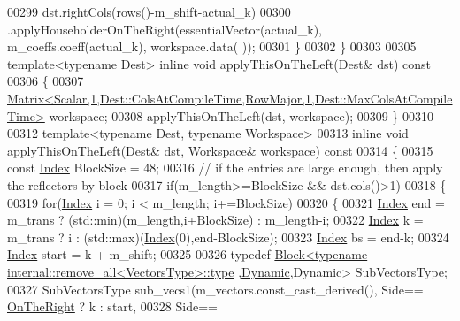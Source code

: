 \begin{DoxyCode}
00299         dst.rightCols(rows()-m\_shift-actual\_k)
00300            .applyHouseholderOnTheRight(essentialVector(actual\_k), m\_coeffs.coeff(actual\_k), workspace.data(
      ));
00301       \}
00302     \}
00303 
00305     \textcolor{keyword}{template}<\textcolor{keyword}{typename} Dest> \textcolor{keyword}{inline} \textcolor{keywordtype}{void} applyThisOnTheLeft(Dest& dst)\textcolor{keyword}{ const}
00306 \textcolor{keyword}{    }\{
00307       
      \hyperlink{group___core___module_class_eigen_1_1_matrix}{Matrix<Scalar,1,Dest::ColsAtCompileTime,RowMajor,1,Dest::MaxColsAtCompileTime>}
       workspace;
00308       applyThisOnTheLeft(dst, workspace);
00309     \}
00310 
00312     \textcolor{keyword}{template}<\textcolor{keyword}{typename} Dest, \textcolor{keyword}{typename} Workspace>
00313     \textcolor{keyword}{inline} \textcolor{keywordtype}{void} applyThisOnTheLeft(Dest& dst, Workspace& workspace)\textcolor{keyword}{ const}
00314 \textcolor{keyword}{    }\{
00315       \textcolor{keyword}{const} \hyperlink{group___core___module_a554f30542cc2316add4b1ea0a492ff02}{Index} BlockSize = 48;
00316       \textcolor{comment}{// if the entries are large enough, then apply the reflectors by block}
00317       \textcolor{keywordflow}{if}(m\_length>=BlockSize && dst.cols()>1)
00318       \{
00319         \textcolor{keywordflow}{for}(\hyperlink{group___core___module_a554f30542cc2316add4b1ea0a492ff02}{Index} i = 0; i < m\_length; i+=BlockSize)
00320         \{
00321           \hyperlink{group___core___module_a554f30542cc2316add4b1ea0a492ff02}{Index} end = m\_trans ? (std::min)(m\_length,i+BlockSize) : m\_length-i;
00322           \hyperlink{group___core___module_a554f30542cc2316add4b1ea0a492ff02}{Index} k = m\_trans ? i : (std::max)(\hyperlink{namespace_eigen_a62e77e0933482dafde8fe197d9a2cfde}{Index}(0),end-BlockSize);
00323           \hyperlink{group___core___module_a554f30542cc2316add4b1ea0a492ff02}{Index} bs = end-k;
00324           \hyperlink{group___core___module_a554f30542cc2316add4b1ea0a492ff02}{Index} start = k + m\_shift;
00325           
00326           \textcolor{keyword}{typedef} \hyperlink{group___core___module_class_eigen_1_1_block}{Block<typename internal::remove\_all<VectorsType>::type}
      ,\hyperlink{namespace_eigen_ad81fa7195215a0ce30017dfac309f0b2}{Dynamic},Dynamic> SubVectorsType;
00327           SubVectorsType sub\_vecs1(m\_vectors.const\_cast\_derived(), Side==
      \hyperlink{group__enums_ggac22de43beeac7a78b384f99bed5cee0ba99dc75d8e00b6c3a5bdc31940f47492b}{OnTheRight} ? k : start,
00328                                                                    Side==

\end{DoxyCode}
